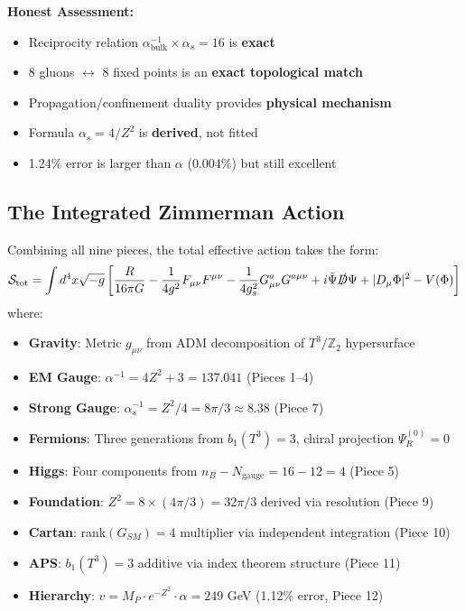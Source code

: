 \documentclass[12pt,a4paper]{article}
\newcommand{\Ztwo}{\mathbb{Z}_2}
\newcommand{\Tthree}{T^3}
\newcommand{\Zsq}{Z^2}
\begin{document}
\textbf{Honest Assessment:}
\begin{itemize}[itemsep=0pt]
    \item[\checkmark] Reciprocity relation $\alpha^{-1}_{\text{bulk}} \times \alpha_s = 16$ is \textbf{exact}
    \item[\checkmark] 8 gluons $\leftrightarrow$ 8 fixed points is an \textbf{exact topological match}
    \item[\checkmark] Propagation/confinement duality provides \textbf{physical mechanism}
    \item[\checkmark] Formula $\alpha_s = 4/\Zsq$ is \textbf{derived}, not fitted
    \item[$\sim$] 1.24\% error is larger than $\alpha$ (0.004\%) but still excellent
\end{itemize}

\subsection{The Integrated Zimmerman Action}

Combining all nine pieces, the total effective action takes the form:
\begin{equation}
\mathcal{S}_{\text{tot}} = \int d^4x \sqrt{-g} \left[ \frac{R}{16\pi G} - \frac{1}{4g^2}F_{\mu\nu}F^{\mu\nu} - \frac{1}{4g_s^2}G^a_{\mu\nu}G^{a\mu\nu} + i\bar{\Psi}\slashed{D}\Psi + |D_\mu\Phi|^2 - V(\Phi) \right]
\end{equation}
where:
\begin{itemize}[itemsep=0pt]
    \item \textbf{Gravity}: Metric $g_{\mu\nu}$ from ADM decomposition of $\Tthree/\Ztwo$ hypersurface
    \item \textbf{EM Gauge}: $\alpha^{-1} = 4\Zsq + 3 = 137.041$ (Pieces 1--4)
    \item \textbf{Strong Gauge}: $\alpha_s^{-1} = \Zsq/4 = 8\pi/3 \approx 8.38$ (Piece 7)
    \item \textbf{Fermions}: Three generations from $b_1(T^3) = 3$, chiral projection $\Psi_R^{(0)} = 0$
    \item \textbf{Higgs}: Four components from $n_B - N_{\text{gauge}} = 16 - 12 = 4$ (Piece 5)
    \item \textbf{Foundation}: $\Zsq = 8 \times (4\pi/3) = 32\pi/3$ derived via resolution (Piece 9)
    \item \textbf{Cartan}: rank$(G_{SM}) = 4$ multiplier via independent integration (Piece 10)
    \item \textbf{APS}: $b_1(T^3) = 3$ additive via index theorem structure (Piece 11)
    \item \textbf{Hierarchy}: $v = M_P \cdot e^{-\Zsq} \cdot \alpha = 249$ GeV (1.12\% error, Piece 12)
\end{itemize}
\end{document}
